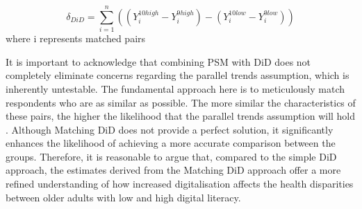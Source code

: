\begin{enumerate}[wide=0pt, leftmargin=*, labelwidth=0pt, labelindent=\parindent, itemindent=0pt]
    \begin{equation}
        \label{eq:did}
        \delta_{DiD} = \sum_{i=1}^{n} \left( (Y_{i}^{10high} - Y_{i}^{9high}) - (Y_{i}^{10low} - Y_{i}^{9low}) \right)
    \end{equation}
    where i represents matched pairs
\end{enumerate}

It is important to acknowledge that combining PSM with DiD does not completely eliminate concerns regarding the parallel trends assumption, which is inherently untestable. The fundamental approach here is to meticulously match respondents who are as similar as possible. The more similar the characteristics of these pairs, the higher the likelihood that the parallel trends assumption will hold \parencite{abadie_matching_2016}. Although Matching DiD does not provide a perfect solution, it significantly enhances the likelihood of achieving a more accurate comparison between the groups. Therefore, it is reasonable to argue that, compared to the simple DiD approach, the estimates derived from the Matching DiD approach offer a more refined understanding of how increased digitalisation affects the health disparities between older adults with low and high digital literacy.